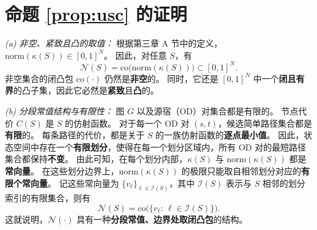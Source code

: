 \documentclass[journal]{IEEEtran}
\theoremstyle{plain}
\theoremstyle{definition}
\begin{document}
\section{命题 \ref{prop:usc} 的证明}
\label{app:proof_prop_usc}
\begin{IEEEproof}
\textit{(a) 非空、紧致且凸的取值：}
根据第三章 A 节中的定义，$\mathrm{norm}(\kappa(S))\in[0,1]^N$。
因此，对任意 $S$，有
\begin{equation}
\mathcal N(S)=\mathrm{co}\!\big(\mathrm{norm}(\kappa(S))\big)\subset[0,1]^N.
\end{equation}
非空集合的闭凸包 $\mathrm{co}(\cdot)$ 仍然是\textbf{非空}的。
同时，它还是 $[0,1]^N$ 中一个\textbf{闭且有界}的凸子集，因此它必然是\textbf{紧致}且\textbf{凸}的。

\textit{(b) 分段常值结构与有限性：}
图 $G$ 以及源宿（OD）对集合都是有限的。
节点代价 $C(S)$ 是 $S$ 的仿射函数。
对于每一个 OD 对 $(s,t)$，候选简单路径集合都是\textbf{有限}的。
每条路径的代价，都是关于 $S$ 的一族仿射函数的\textbf{逐点最小值}。
因此，状态空间中存在一个\textbf{有限划分}，使得在每一个划分区域内，所有 OD 对的最短路径集合都保持\textbf{不变}。
由此可知，在每个划分内部，$\kappa(S)$ 与 $\mathrm{norm}(\kappa(S))$ 都是\textbf{常向量}。
在这些划分边界上，$\mathrm{norm}(\kappa(S))$ 的极限只能取自相邻划分对应的\textbf{有限个常向量}。
记这些常向量为 $\{v_\ell\}_{\ell\in\mathcal I(S)}$，其中 $\mathcal I(S)$ 表示与 $S$ 相邻的划分索引的有限集合，则有
\begin{equation}
\mathcal N(S)=\mathrm{co}\big(\{v_\ell:\,\ell\in\mathcal I(S)\}\big).
\end{equation}
这就说明，$\mathcal N(\cdot)$ 具有一种\textbf{分段常值、边界处取闭凸包}的结构。


\end{IEEEproof}
\end{document}
